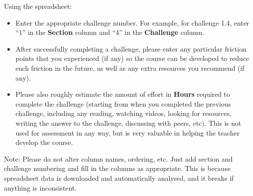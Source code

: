 Using the spreadsheet:

\begin{itemize}
    \item Enter the appropriate challenge number. For example, for challenge 1.4, enter ``1'' in the \textbf{Section} column and ``4'' in the \textbf{Challenge} column.
    \item After successfully completing a challenge, please enter any particular friction points that you experienced (if any) so the course can be developed to reduce such friction in the future, as well as any extra resources you recommend (if any).
    \item Please also roughly estimate the amount of effort in \textbf{Hours} required to complete the challenge (starting from when you completed the previous challenge, including any reading, watching videos, looking for resources, writing the answer to the challenge, discussing with peers, etc). This is not used for assessment in any way, but is very valuable in helping the teacher develop the course.
\end{itemize}

Note: Please do not alter column names, ordering, etc. Just add section and challenge numbering and fill in the columns as appropriate. This is because spreadsheet data is downloaded and automatically analysed, and it breaks if anything is inconsistent.



